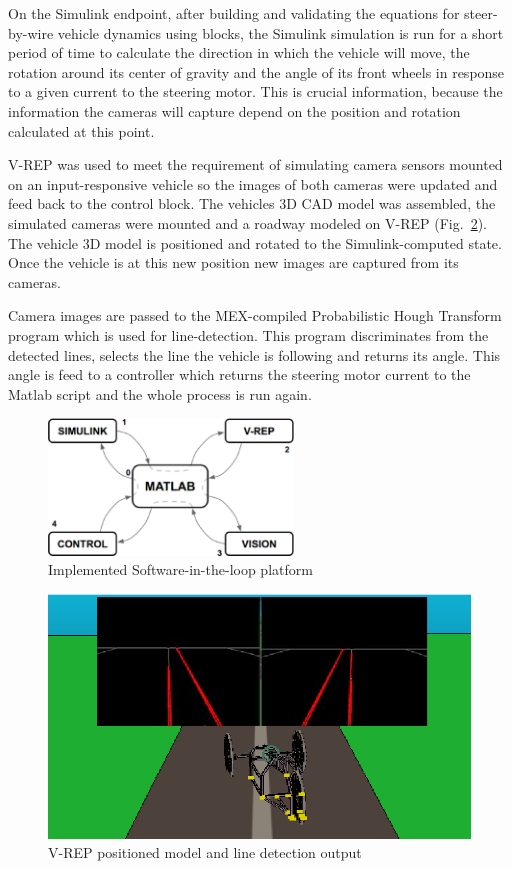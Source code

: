 \documentclass[twocolumn,10pt]{asme2e}
\begin{document}
On the Simulink endpoint, after building and validating the equations for
steer-by-wire vehicle dynamics using blocks, the Simulink simulation is run
for a short period of time to calculate the direction in which the vehicle
will move, the rotation around its center of gravity and the angle of its
front wheels in response to a given current to the steering motor. This is crucial
information, because the information the cameras will capture depend on the
position and rotation calculated at this point.

V-REP was used to meet the requirement of simulating camera sensors mounted
on an input-responsive vehicle so the images of both cameras were
updated and feed back to the control block. The vehicles 3D CAD model was assembled,
the simulated cameras were mounted and a roadway modeled on V-REP (Fig.~\ref{figs/fig_vas_virtual}). The vehicle
3D model is positioned and rotated to the Simulink-computed state. Once the 
vehicle is at this new position new images are captured from its cameras.

Camera images are passed to the MEX-compiled Probabilistic Hough Transform 
program which is used for line-detection. This program discriminates from
the detected lines, selects the line the vehicle is following and returns
its angle. This angle is feed to a controller which returns the steering
motor current to the Matlab script and the whole process is run again.

\begin{figure}
\begin{center}
\includegraphics[width=6.5cm]{figs/fig_platform.eps}
\caption{Implemented Software-in-the-loop platform}
\label{figs/fig_platform}
\end{center}
\end{figure}

\begin{figure}
\begin{center}
\includegraphics{figs/fig_vas_virtual.eps}
\caption{V-REP positioned model and line detection output}
\label{figs/fig_vas_virtual}
\end{center}
\end{figure}
\end{document}
